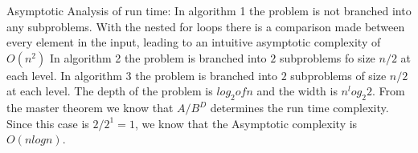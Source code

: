 Asymptotic Analysis of run time:
	In algorithm 1 the problem is not branched into any subproblems.  With the nested for loops there is a comparison made between every element in the input, leading to an intuitive asymptotic complexity of $O(n^2)$
	In algorithm 2 the problem is branched into $2$ subproblems fo size $n/2$ at each level.  
	In algorithm 3 the problem is branched into $2$ subproblems of size $n/2$ at each level.  The depth of the problem is $log_2 of n$ and the width is $n^log_2 2$.  From the master theorem we know that $A/B^D$ determines the run time complexity.  Since this case is $2/2^1 = 1$, we know that the Asymptotic complexity is $O(n log n)$.
